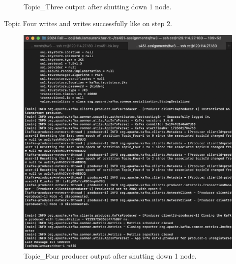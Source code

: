 \documentclass{article}
\begin{document}
\begin{enumerate}
\begin{figure}[H]
\begin{minipage}{0.45\textwidth}
      \caption{Topic\_Three output after shutting down 1 node.}
    \end{minipage}
  \end{figure}

  Topic Four writes and writes successfully like on step 2.

  \begin{figure}[H]
    \centering
    \begin{minipage}{0.45\textwidth}
      \centering
      \includegraphics[width=1\textwidth]{image6.png}
      \caption{Topic\_Four producer output after shutting down 1 node.}
    \end{minipage}
    \begin{minipage}{0.45\textwidth}
      \centering

\end{minipage}
\end{figure}
\end{enumerate}
\end{document}
